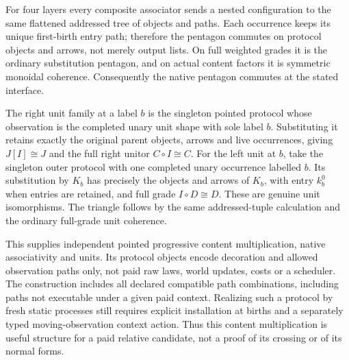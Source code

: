 \documentclass[11pt]{article}
\begin{document}
For four layers every composite associator sends a nested configuration to the same flattened addressed tree of objects and paths. Each occurrence keeps its unique first-birth entry path; therefore the pentagon commutes on protocol objects and arrows, not merely output lists. On full weighted grades it is the ordinary substitution pentagon, and on actual content factors it is symmetric monoidal coherence. Consequently the native pentagon commutes at the stated interface.

The right unit family at a label $b$ is the singleton pointed protocol whose observation is the completed unary unit shape with sole label $b$. Substituting it retains exactly the original parent objects, arrows and live occurrences, giving $J[I]\cong J$ and the full right unitor $C\circ I\cong C$. For the left unit at $b$, take the singleton outer protocol with one completed unary occurrence labelled $b$. Its substitution by $K_b$ has precisely the objects and arrows of $K_b$, with entry $k_b^0$ when entries are retained, and full grade $I\circ D\cong D$. These are genuine unit isomorphisms. The triangle follows by the same addressed-tuple calculation and the ordinary full-grade unit coherence.

This supplies independent pointed progressive content multiplication, native associativity and units. Its protocol objects encode decoration and allowed observation paths only, not paid raw laws, world updates, costs or a scheduler. The construction includes all declared compatible path combinations, including paths not executable under a given paid context. Realizing such a protocol by fresh static processes still requires explicit installation at births and a separately typed moving-observation context action. Thus this content multiplication is useful structure for a paid relative candidate, not a proof of its crossing or of its normal forms.
\end{document}
